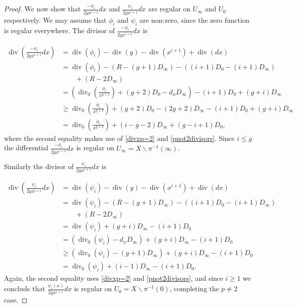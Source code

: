 \documentclass[draft, 11pt]{article} %
\theoremstyle{plain}
\theoremstyle{remark}
\DeclareMathOperator{\di}{div}
\begin{document}
\begin{proof}
We now show that $\frac{-\phi_i}{2yx^{i+1}}dx$ and $\frac{\psi_i}{2yx^{i+1}}dx$ are regular on $U_\infty$ and $U_0$ respectively.
We may assume that $\phi_i$ and $\psi_i$ are non-zero, since the zero function is regular everywhere.
The divisor of $\frac{-\phi_i}{2yx^{i+1}}dx$ is

\begin{align*}
\di\left( \frac{-\phi_i}{2yx^{i+1}}dx \right) & =  \di(\phi_i) -\di(y) - \di(x^{i+1}) + \di (dx) \\
& =  \di(\phi_i) - ( R - (g+1)D_\infty) - ((i+1)D_0 - (i+1)D_\infty) \\
& \qquad + (R - 2D_\infty) \\
& =  \left( \di_0\left( \frac{\phi_i}{x^{g+2}}\right) + (g+2)D_0 - d_\phi D_\infty\right) - (i+1)D_0 + (g+i)D_\infty \\
& \geq  \di_0\left( \frac{\phi_i}{x^{g+2}}\right) + (g+2)D_0 - (2g+2)D_\infty - (i+1)D_0 + (g+i)D_\infty \\
& =  \di_0\left( \frac{\phi_i}{x^{g+2}} \right) + (i-g-2)D_\infty + (g-i+1)D_0,
\end{align*}
where the second equality makes use of \eqref{divxp=2} and \eqref{pnot2divisors}.
Since $i \leq g$ the differential $\frac{-\phi_i}{2yx^{i+1}}dx$ is regular on $U_\infty = X\backslash \pi^{-1}(\infty)$.

Similarly the divisor of $\frac{\psi_i}{2yx^{i+1}}dx$ is

\begin{align*}
\di \left( \frac{\psi_i}{2yx^{i+1}}dx\right) & =  \di(\psi_i) - \di(y) - \di(x^{i+1}) + \di (dx) \\
& =  \di (\psi_i ) -(R - (g+1)D_\infty) - ((i+1)D_0 - (i+1)D_\infty) \\ 
& \qquad + (R -2D_\infty) \\
& =  \di(\psi_i) + (g+i)D_\infty -(i+1)D_0 \\
& =  (\di_0(\psi_i) -d_\psi D_\infty) + (g+i)D_\infty -(i+1)D_0 \\
& \geq \left( \di_0(\psi_i) - (g+1)D_\infty \right) + (g+i)D_\infty -(i+1)D_0 \\
& =  \di_0(\psi_i) + (i-1)D_\infty - (i+1)D_0.
\end{align*}
Again, the second equality uses \eqref{divxp=2} and \eqref{pnot2divisors}, and since $i\geq 1$ we conclude that $\frac{\psi_i(x)}{2yx^{i+1}}dx$ is regular on $U_0 = X \backslash \pi^{-1}(0)$, completing the $p\neq 2$ case.



\end{proof}
\end{document}
